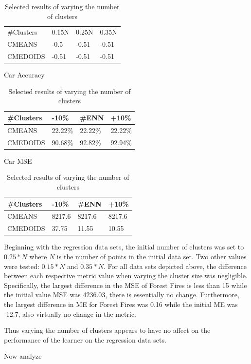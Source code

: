 \documentclass[twoside,11pt]{article}
\begin{document}
\begin{table}[h]
\begin{minipage}[b]{0.45\linewidth}
		\begin{tabular}{llll}
			\cline{1-4}
			\#Clusters & 0.15N & 0.25N & 0.35N \\  \cline{1-4}
			CMEANS     & -0.5  & -0.51 & -0.51 \\
			CMEDOIDS   & -0.51 & -0.51 & -0.51
		\end{tabular}
	\end{minipage}
	\begin{minipage}[b]{0.45\linewidth}\centering
		Car Accuracy
		\begin{tabular}{llll}
			\hline
			\#Clusters & -10\% & \#ENN   & +10\% \\ \hline
			CMEANS     & 22.22\%      & 22.22\% & 22.22\%      \\
			CMEDOIDS   & 90.68\%      & 92.82\% & 92.94\%
		\end{tabular}
	\end{minipage}
	\hspace{0.5cm}
	\begin{minipage}[b]{0.45\linewidth}
		Car MSE
		\centering
		\begin{tabular}{llll}
			\hline
			\#Clusters & -10\% & \#ENN  & +10\% \\ \hline
			CMEANS     & 8217.6       & 8217.6 & 8217.6       \\
			CMEDOIDS   & 37.75        & 11.55  & 10.55
		\end{tabular}
	\end{minipage}
	\caption{Selected results of varying the number of clusters}
\end{table}

Beginning with the regression data sets, the initial number of clusters was set to $ 0.25 * N$ where $N$ is the number of points in the initial data set. Two other values were tested: $ 0.15 * N$ and $ 0.35 * N$.
For all data sets depicted above, the difference between each respective metric value when varying the cluster size was negligible.
Specifically, the largest difference in the MSE of Forest Fires is less than 15 while the initial value MSE was 4236.03, there is essentially no change.
Furthermore, the largest difference in ME for Forest Fires was 0.16 while the initial ME was -12.7, also virtually no change in the metric.

Thus varying the number of clusters appears to have no affect on the performance of the learner on the regression data sets.

Now analyze 
\end{document}
